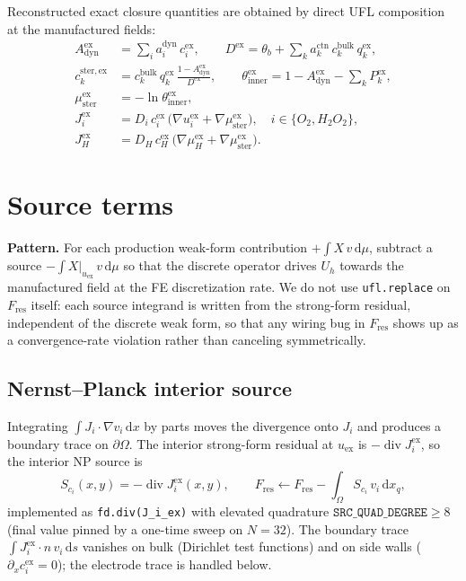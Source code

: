 \documentclass[11pt]{article}
\DeclareMathOperator{\divg}{div}
\newcommand{\ster}{\mathrm{ster}}
\newcommand{\dyn}{\mathrm{dyn}}
\newcommand{\bulk}{\mathrm{bulk}}
\begin{document}
Reconstructed exact closure quantities are obtained by direct UFL composition
at the manufactured fields:
\begin{align}
  A_\dyn^\mathrm{ex} &= \sum_i a_i^\dyn\, c_i^\mathrm{ex},
   \qquad
  D^\mathrm{ex} = \theta_b + \sum_k a_k^{\mathrm{ctn}}\, c_k^\bulk\, q_k^\mathrm{ex},
   \\
  c_k^{\ster,\mathrm{ex}} &= c_k^\bulk\, q_k^\mathrm{ex}\,
                              \frac{1 - A_\dyn^\mathrm{ex}}{D^\mathrm{ex}},
   \qquad
  \theta_\mathrm{inner}^\mathrm{ex} = 1 - A_\dyn^\mathrm{ex} - \sum_k P_k^\mathrm{ex},
   \\
  \mu_\ster^\mathrm{ex} &= -\ln \theta_\mathrm{inner}^\mathrm{ex},
   \\
  J_i^\mathrm{ex} &= D_i\, c_i^\mathrm{ex}\, \bigl(\nabla u_i^\mathrm{ex} + \nabla \mu_\ster^\mathrm{ex}\bigr),
    \quad i \in \{O_2, H_2O_2\},
   \\
  J_H^\mathrm{ex} &= D_H\, c_H^\mathrm{ex}\, \bigl(\nabla \mu_H^\mathrm{ex} + \nabla \mu_\ster^\mathrm{ex}\bigr).
\end{align}

\section{Source terms}

\textbf{Pattern.} For each production weak-form contribution
$+\int X\, v\, \mathrm{d}\mu$, subtract a source $-\int X|_{u_\mathrm{ex}}\, v\, \mathrm{d}\mu$
so that the discrete operator drives $U_h$ towards the manufactured field at
the FE discretization rate. We do not use \verb|ufl.replace| on $F_\mathrm{res}$
itself: each source integrand is written from the strong-form residual,
independent of the discrete weak form, so that any wiring bug in $F_\mathrm{res}$
shows up as a convergence-rate violation rather than canceling symmetrically.

\subsection{Nernst--Planck interior source}

Integrating $\int J_i \cdot \nabla v_i\, \mathrm{d}x$ by parts moves the
divergence onto $J_i$ and produces a boundary trace on $\partial \Omega$. The
interior strong-form residual at $u_\mathrm{ex}$ is $-\divg J_i^\mathrm{ex}$,
so the interior NP source is
\begin{equation}
\boxed{
  S_{c_i}(x,y) = -\divg J_i^\mathrm{ex}(x,y),
  \qquad
  F_\mathrm{res} \leftarrow F_\mathrm{res} - \int_\Omega S_{c_i}\, v_i\, \mathrm{d}x_q,
}
\end{equation}
implemented as \verb|fd.div(J_i_ex)| with elevated quadrature
$\mathtt{SRC\_QUAD\_DEGREE} \geq 8$ (final value pinned by a one-time sweep
on $N=32$). The boundary trace $\int J_i^\mathrm{ex} \cdot n\, v_i\, \mathrm{d}s$
vanishes on bulk (Dirichlet test functions) and on side walls
($\partial_x c_i^\mathrm{ex} = 0$); the electrode trace is handled below.
\end{document}
